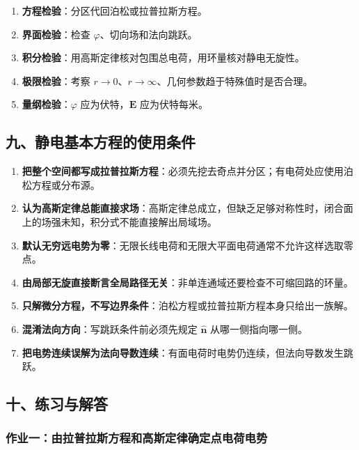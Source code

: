 \begin{enumerate}
\def\labelenumi{\arabic{enumi}.}
\tightlist
\item
  \textbf{方程检验}：分区代回泊松或拉普拉斯方程。
\item
  \textbf{界面检验}：检查 \(\varphi\)、切向场和法向跳跃。
\item
  \textbf{积分检验}：用高斯定律核对包围总电荷，用环量核对静电无旋性。
\item
  \textbf{极限检验}：考察
  \(r\to0\)、\(r\to\infty\)、几何参数趋于特殊值时是否合理。
\item
  \textbf{量纲检验}：\(\varphi\) 应为伏特，\(\mathbf E\) 应为伏特每米。
\end{enumerate}

\subsection{九、静电基本方程的使用条件}\label{m2:ux4e5dux9759ux7535ux57faux672cux65b9ux7a0bux7684ux4f7fux7528ux6761ux4ef6}

\begin{enumerate}
\def\labelenumi{\arabic{enumi}.}
\tightlist
\item
  \textbf{把整个空间都写成拉普拉斯方程}：必须先挖去奇点并分区；有电荷处应使用泊松方程或分布源。
\item
  \textbf{认为高斯定律总能直接求场}：高斯定律总成立，但缺乏足够对称性时，闭合面上的场强未知，积分式不能直接解出局域场。
\item
  \textbf{默认无穷远电势为零}：无限长线电荷和无限大平面电荷通常不允许这样选取零点。
\item
  \textbf{由局部无旋直接断言全局路径无关}：非单连通域还要检查不可缩回路的环量。
\item
  \textbf{只解微分方程，不写边界条件}：泊松方程或拉普拉斯方程本身只给出一族解。
\item
  \textbf{混淆法向方向}：写跳跃条件前必须先规定 \(\hat{\mathbf n}\)
  从哪一侧指向哪一侧。
\item
  \textbf{把电势连续误解为法向导数连续}：有面电荷时电势仍连续，但法向导数发生跳跃。
\end{enumerate}

\subsection{十、练习与解答}\label{m2:ux5341ux7ec3ux4e60ux4e0eux89e3ux7b54}

\subsubsection{作业一：由拉普拉斯方程和高斯定律确定点电荷电势}\label{m2:ux4f5cux4e1aux4e00ux7531ux62c9ux666eux62c9ux65afux65b9ux7a0bux548cux9ad8ux65afux5b9aux5f8bux786eux5b9aux70b9ux7535ux8377ux7535ux52bf}

